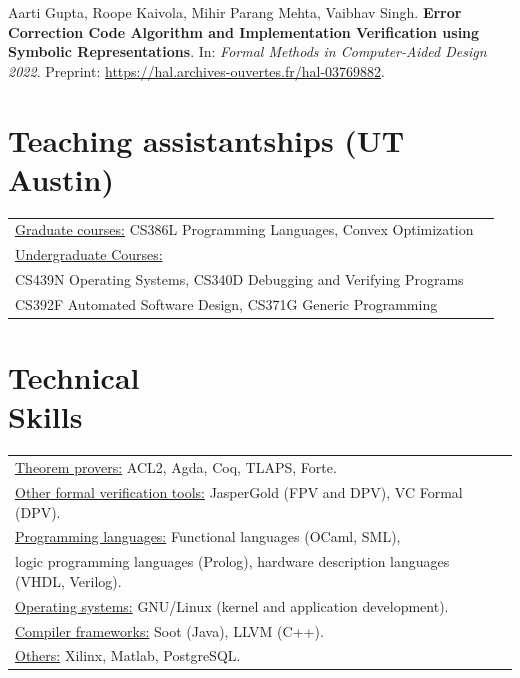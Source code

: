 \documentclass[margin]{res}
\begin{document}
\begin{resume}
  Aarti Gupta, Roope Kaivola, Mihir Parang Mehta, Vaibhav Singh. {\bf
    Error Correction Code Algorithm and Implementation Verification
    using Symbolic Representations}. In: \textit{Formal
    Methods in Computer-Aided Design 2022}. Preprint:
  \url{https://hal.archives-ouvertes.fr/hal-03769882}.

\section{Teaching assistantships (UT Austin)}
\begin{tabular}{l p{3in}}
  \underline{Graduate courses:} CS386L Programming Languages, Convex Optimization \\
  \underline{Undergraduate Courses:} \\
  CS439N Operating Systems, CS340D Debugging and Verifying Programs \\
  CS392F Automated Software Design, CS371G Generic Programming
\end{tabular}

\section{Technical \\ Skills}
   \begin{tabular}{l p{3in}}
    \underline{Theorem provers:} ACL2, Agda, Coq, TLAPS, Forte. \\
    \underline{Other formal verification tools:} JasperGold (FPV and DPV), VC Formal (DPV). \\

    \underline{Programming languages:} Functional languages (OCaml,
    SML), \\ logic programming languages (Prolog),
    hardware description languages (VHDL, Verilog). \\

    \underline{Operating systems:} GNU/Linux (kernel and application development). \\

    \underline{Compiler frameworks:} Soot (Java), LLVM (C++). \\

    \underline{Others:} Xilinx, Matlab, PostgreSQL. \\
 \end{tabular}


\end{resume}
\end{document}
